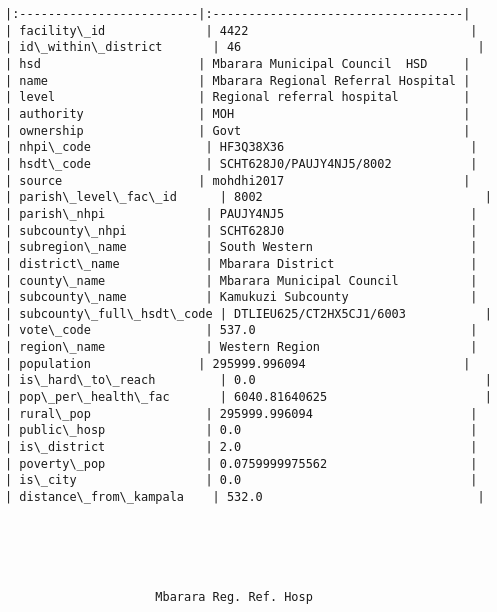 \documentclass[11pt]{article}
\begin{document}
\begin{Verbatim}[commandchars=\\\{\}]
|:-------------------------|:-----------------------------------|
| facility\_id              | 4422                               |
| id\_within\_district       | 46                                 |
| hsd                      | Mbarara Municipal Council  HSD     |
| name                     | Mbarara Regional Referral Hospital |
| level                    | Regional referral hospital         |
| authority                | MOH                                |
| ownership                | Govt                               |
| nhpi\_code                | HF3Q38X36                          |
| hsdt\_code                | SCHT628J0/PAUJY4NJ5/8002           |
| source                   | mohdhi2017                         |
| parish\_level\_fac\_id      | 8002                               |
| parish\_nhpi              | PAUJY4NJ5                          |
| subcounty\_nhpi           | SCHT628J0                          |
| subregion\_name           | South Western                      |
| district\_name            | Mbarara District                   |
| county\_name              | Mbarara Municipal Council          |
| subcounty\_name           | Kamukuzi Subcounty                 |
| subcounty\_full\_hsdt\_code | DTLIEU625/CT2HX5CJ1/6003           |
| vote\_code                | 537.0                              |
| region\_name              | Western Region                     |
| population               | 295999.996094                      |
| is\_hard\_to\_reach         | 0.0                                |
| pop\_per\_health\_fac       | 6040.81640625                      |
| rural\_pop                | 295999.996094                      |
| public\_hosp              | 0.0                                |
| is\_district              | 2.0                                |
| poverty\_pop              | 0.0759999975562                    |
| is\_city                  | 0.0                                |
| distance\_from\_kampala    | 532.0                              |





                     Mbarara Reg. Ref. Hosp                      


\end{Verbatim}
\end{document}
